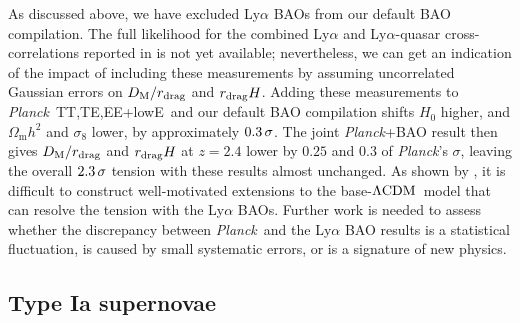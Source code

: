 \documentclass[longauth,traditabstract]{aa}
\def\Planck{\textit{Planck}}
\def\,{\thinspace}
\newcommand{\mksym}[1]{\ifmmode {\rm #1}\else #1\fi}
\newcommand{\dataplus}{\allowbreak+}
\newcommand{\TTTEEE}{\mksym{TT,TE,EE}}
\newcommand{\planckTTTEEEonly}{\planck\ \TTTEEE}
\newcommand{\lowE}{\mksym{lowE}}
\newcommand{\planckall}{\planckTTTEEEonly\dataplus\lowE}
\newcommand{\rdrag}{r_{\rm drag}}
\newcommand{\DM}{D_{\rm M}}
\providecommand{\Omm}{\Omega_{\mathrm{m}}}
\providecommand{\LCDM}{{$\rm{\Lambda CDM}$}}
\newcommand{\planck}{\Planck}
\begin{document}
As discussed above, we have excluded Ly\,$\alpha$ BAOs from our default BAO compilation. The full likelihood
for the combined Ly\,$\alpha$ and Ly\,$\alpha$-quasar cross-correlations reported in \citet{Bourboux:2017cbm} is not
yet available; nevertheless, we can get an indication of the impact of including these measurements
by assuming uncorrelated Gaussian errors on $\DM/\rdrag$ and $\rdrag H$. Adding these measurements to
\planckall\ and our default BAO compilation shifts $H_0$ higher, and $\Omm h^2$ and $\sigma_8$ lower,
by approximately $0.3\,\sigma$. The joint \planck+BAO result then gives
$\DM/\rdrag$ and $\rdrag H$ at $z=2.4$ lower by $0.25$ and
$0.3$ of \planck's $\sigma$, leaving the overall $2.3\,\sigma$ tension with these
results almost unchanged.  As shown by \citet{Aubourg:2014yra}, it is
difficult to construct well-motivated extensions to the base-\LCDM\
model that can resolve the tension with the Ly\,$\alpha$ BAOs. Further work is needed to assess whether the
discrepancy between \Planck\ and the Ly\,$\alpha$ BAO results is a statistical fluctuation,
is caused by small systematic errors, or is a signature of new physics.


\subsection{Type Ia supernovae}\label{sec:SN}
\end{document}
